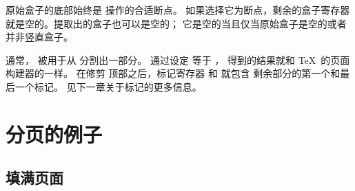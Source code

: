 \documentclass{book}
\begin{document}
原始盒子的底部始终是  操作的合适断点。
如果选择它为断点，剩余的盒子寄存器就是空的。提取出的盒子也可以是空的；
它是空的当且仅当原始盒子是空的或者并非竖直盒子。

通常， 被用于从  分割出一部分。
通过设定  等于 ，
得到的结果就和 \TeX\ 的页面构建器的一样。
在修剪  顶部之后，标记寄存器  和 
就包含  剩余部分的第一个和最后一个标记。
见下一章关于标记的更多信息。

\section{分页的例子}

\subsection{填满页面}
\end{document}
